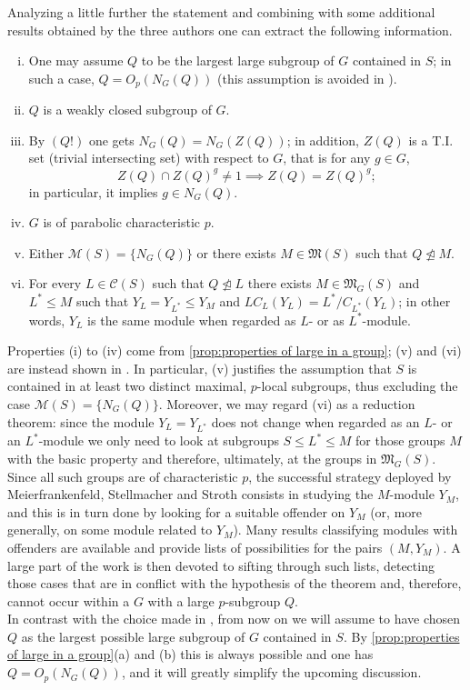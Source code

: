\documentclass{amsart}
\numberwithin{equation}{section}
\theoremstyle{definition}
\theoremstyle{subresult}
\theoremstyle{caseresult}
\newcommand{\M}{\mathcal{M}}
\newcommand{\gM}{\mathfrak{M}}
\newcommand{\C}{\mathcal{C}}
\newcommand{\norm}{\trianglelefteq}
\newcommand{\<}{\langle}
\renewcommand{\>}{\rangle}
\begin{document}
\vspace*{0.2cm}
Analyzing a little further the statement and combining with some additional results obtained by the three authors one can extract the following information.
\begin{enumerate}[(i)]
	\item One may assume $Q$ to be the largest large subgroup of $G$ contained in $S$; in such a case, $Q = O_p(N_G(Q))$ (this assumption is avoided in \cite{Meier-Stell-Stroth:2012}).
	\item $Q$ is a weakly closed subgroup of $G$.
	\item By $(Q!)$ one gets $N_G(Q) = N_G(Z(Q))$; in addition, $Z(Q)$ is a T.I. set (trivial intersecting set) with respect to $G$, that is for any $g \in G$,
	\[
	Z(Q) \cap Z(Q)^g \ne 1 \implies Z(Q) =Z(Q)^g;
	\]
	in particular, it implies $g \in N_G(Q)$.
	\item $G$ is of parabolic characteristic $p$.
	\item Either $\M(S) = \{N_G(Q)\}$ or there exists $M \in \gM(S)$ such that $Q \not \norm M$.
	\item For every $L \in \C(S)$ such that $Q \not \norm L$ there exists $M \in \gM_G(S)$ and $L^* \le M$ such that $Y_L = Y_{L^*} \le Y_M$ and $L C_L(Y_L) = L^* / C_{L^*}(Y_{L})$; in other words, $Y_L$ is the same module when regarded as $L$- or as $L^*$-module.
\end{enumerate}
Properties (i) to (iv) come from \ref{prop:properties of large in a group}; (v) and (vi) are instead shown in \cite[Lemma 1.56]{Meier-Stell-Stroth:2012}. In particular, (v) justifies the assumption that $S$ is contained in at least two distinct maximal, $p$-local subgroups, thus excluding the case $\M(S) = \{N_G(Q)\}$. Moreover, we may regard (vi) as a reduction theorem: since the module $Y_L = Y_{L^*}$ does not change when regarded as an $L$- or an $L^*$-module we only need to look at subgroups $S \le L^* \le M$ for those groups $M$ with the basic property and therefore, ultimately, at the groups in $\gM_G(S)$. Since all such groups are of characteristic $p$, the successful strategy deployed by Meierfrankenfeld, Stellmacher and Stroth consists in studying the $M$-module $Y_M$, and this is in turn done by looking for a suitable offender on $Y_M$ (or, more generally, on some module related to $Y_M$). Many results classifying modules with offenders are available and provide lists of possibilities for the pairs $(M,Y_M)$. A large part of the work is then devoted to sifting through such lists, detecting those cases that are in conflict with the hypothesis of the theorem and, therefore, cannot occur within a $G$ with a large $p$-subgroup $Q$.\\
In contrast with the choice made in \cite{Meier-Stell-Stroth:2012}, from now on we will assume to have chosen $Q$ as the largest possible large subgroup of $G$ contained in $S$. By \ref{prop:properties of large in a group}(a) and (b) this is always possible and one has $Q = O_p(N_G(Q))$, and it will greatly simplify the upcoming discussion.\\
\end{document}
